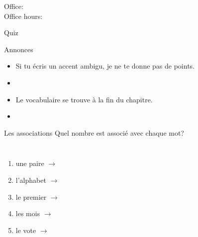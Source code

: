 \documentclass{beamer}
\subtitle[Dates]{Les dates importantes}
\begin{document}
  \begin{frame}
    \titlepage
    \tiny{Office: \\
          Office hours: }
  \end{frame}

  \begin{frame}{}
    \begin{center}
      \Large Quiz
    \end{center}
  \end{frame}

  \begin{frame}{Annonces }
    \begin{itemize}
      \item Si tu écris un accent ambigu, je ne te donne pas de points.
      \item[] 
      \item Le vocabulaire se trouve à la fin du chapitre.
      \item[] 
    \end{itemize}
  \end{frame}

  \begin{frame}{Les associations}
    Quel nombre est associé avec chaque mot? \\
    \begin{columns}
        \begin{enumerate}
          \item une paire $\to$ \underline{}
          \item l'alphabet $\to$ \underline{}
          \item le premier $\to$ \underline{}
          \item les mois $\to$ \underline{}
          \item le vote $\to$ \underline{}
        \end{enumerate}
        \begin{minipage}[c][0.6\textheight]{\linewidth}
          \begin{center}
          \end{center}
        \end{minipage}
    \end{columns}
  \end{frame}
\end{document}
